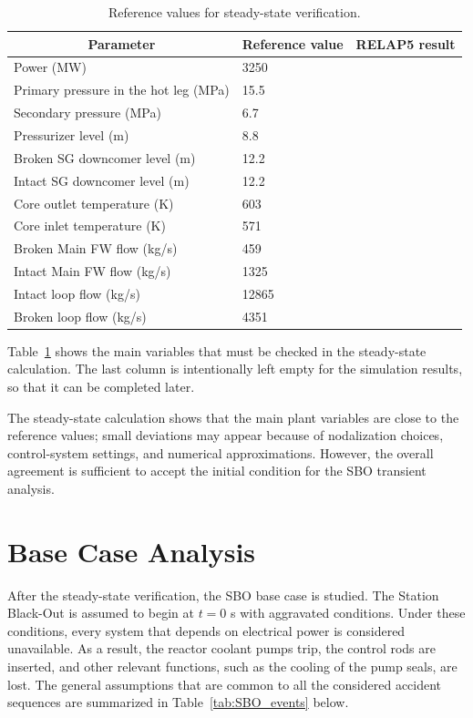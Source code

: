 \documentclass[a4paper,11pt]{article}
\numberwithin{subsubsection}{subsection}
\numberwithin{subsection}{section}
\newcommand{\tabref}[1]{Table~\ref{#1}}
\begin{document}
\begin{table}[H]
\centering
\caption{Reference values for steady-state verification.}
\label{tab:Targetvalues}
\begin{tabular}{l l l}
\toprule
\multicolumn{1}{c}{\textbf{Parameter}} & \textbf{Reference value} & \textbf{RELAP5 result} \\
\midrule
Power (MW) & 3250 & \\
Primary pressure in the hot leg (MPa) & 15.5 & \\
Secondary pressure (MPa) & 6.7 & \\
Pressurizer level (m) & 8.8 & \\
Broken SG downcomer level (m) & 12.2 & \\
Intact SG downcomer level (m) & 12.2 & \\
Core outlet temperature (K) & 603 & \\
Core inlet temperature (K) & 571 & \\
Broken Main FW flow (kg/s) & 459 & \\
Intact Main FW flow (kg/s) & 1325 & \\
Intact loop flow (kg/s) & 12865 & \\
Broken loop flow (kg/s) & 4351 & \\
\bottomrule
\end{tabular}
\end{table}

\tabref{tab:Targetvalues} shows the main variables that must be checked in the steady-state calculation.  
The last column is intentionally left empty for the simulation results, so that it can be completed later.


The steady-state calculation shows that the main plant variables are close to the reference values; small deviations may appear because of nodalization choices, control-system settings, and numerical approximations.  
However, the overall agreement is sufficient to accept the initial condition for the SBO transient analysis.

\section{Base Case Analysis}

After the steady-state verification, the SBO base case is studied. The Station Black-Out is assumed to begin at $t=0$ s with aggravated conditions. 
Under these conditions, every system that depends on electrical power is considered unavailable. 
As a result, the reactor coolant pumps trip, the control rods are inserted, and other relevant functions, such as the cooling of the pump seals, are lost. 
The general assumptions that are common to all the considered accident sequences are summarized in \tabref{tab:SBO_events} below.
\end{document}
